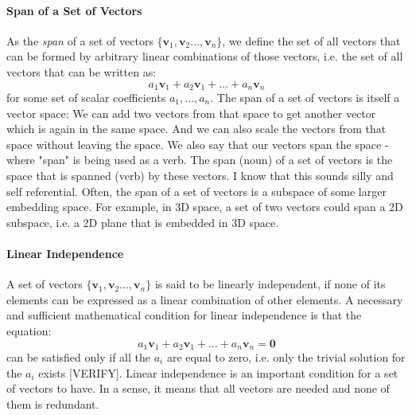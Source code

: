 

\paragraph{Span of a Set of Vectors}
As the \emph{span} of a set of vectors $\{\mathbf{v}_1, \mathbf{v}_2 \ldots, \mathbf{v}_n \}$, we define the set of all vectors that can be formed by arbitrary linear combinations of those vectors, i.e. the set of all vectors that can be written as:
\begin{equation}
 a_1 \mathbf{v}_1 + a_2 \mathbf{v}_1  + \ldots + a_n \mathbf{v}_n 
\end{equation}
for some set of scalar coefficients $a_1, \ldots, a_n$. The span of a set of vectors is itself a vector space: We can add two vectors from that space to get another vector which is again in the same space. And we can also scale the vectors from that space without leaving the space. We also say that our vectors span the space - where "span" is being used as a verb. The span (noun) of a set of vectors is the space that is spanned (verb) by these vectors. I know that this sounds silly and self referential. Often, the span of a set of vectors is a subspace of some larger embedding space. For example, in 3D space, a set of two vectors could span a 2D subspace, i.e. a 2D plane that is embedded in 3D space.


\paragraph{Linear Independence}
A set of vectors $\{\mathbf{v}_1, \mathbf{v}_2 \ldots, \mathbf{v}_n \}$ is said to be linearly independent, if none of its elements can be expressed as a linear combination of other elements. A necessary and sufficient mathematical condition for linear independence is that the equation:
\begin{equation}
 a_1 \mathbf{v}_1 + a_2 \mathbf{v}_1  + \ldots + a_n \mathbf{v}_n = \mathbf{0}
\end{equation}
can be satisfied only if all the $a_i$ are equal to zero, i.e. only the trivial solution for the $a_i$ exists [VERIFY]. Linear independence is an important condition for a set of vectors to have. In a sense, it means that all vectors are needed and none of them is redundant. 

